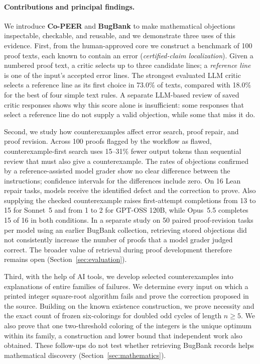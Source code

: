 \paragraph{Contributions and principal findings.}
We introduce \textbf{Co-PEER} and \textbf{BugBank} to make mathematical objections inspectable, checkable, and reusable, and we demonstrate three uses of this evidence. First, from the human-approved core we construct a benchmark of 100 proof texts, each known to contain an error (\emph{certified-claim localization}). Given a numbered proof text, a critic selects up to three candidate lines; a \emph{reference line} is one of the input's accepted error lines. The strongest evaluated LLM critic selects a reference line as its first choice in 73.0\% of texts, compared with 18.0\% for the best of four simple text rules. A separate LLM-based review of saved critic responses shows why this score alone is insufficient: some responses that select a reference line do not supply a valid objection, while some that miss it do.

Second, we study how counterexamples affect error search, proof repair, and proof revision. Across 100 proofs flagged by the workflow as flawed, counterexample-first search uses 15--31\% fewer output tokens than sequential review that must also give a counterexample. The rates of objections confirmed by a reference-assisted model grader show no clear difference between the instructions; confidence intervals for the differences include zero. On 16 Lean repair tasks, models receive the identified defect and the correction to prove. Also supplying the checked counterexample raises first-attempt completions from 13 to 15 for Sonnet~5 and from 1 to 2 for GPT-OSS 120B, while Opus~5.5 completes 15 of 16 in both conditions. In a separate study on 50 paired proof-revision tasks per model using an earlier BugBank collection, retrieving stored objections did not consistently increase the number of proofs that a model grader judged correct. The broader value of retrieval during proof development therefore remains open (Section~\ref{sec:evaluation}).

Third, with the help of AI tools, we develop selected counterexamples into explanations of entire families of failures. We determine every input on which a printed integer square-root algorithm fails and prove the correction proposed in the source. Building on the known existence construction, we prove necessity and the exact count of frozen six-colorings for doubled odd cycles of length $n\ge5$. We also prove that one two-threshold coloring of the integers is the unique optimum within its family, a construction and lower bound that independent work also obtained. These follow-ups do not test whether retrieving BugBank records helps mathematical discovery (Section~\ref{sec:mathematics}).

